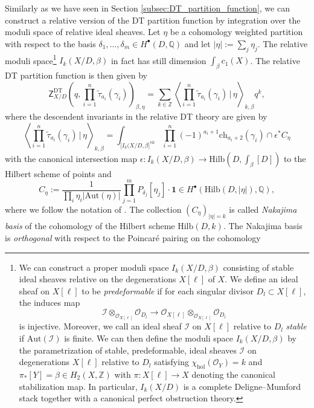 \documentclass[11pt,colorinlistoftodos]{amsart}
\numberwithin{equation}{subsection}
\theoremstyle{plain}
\theoremstyle{definition}
\theoremstyle{remark}
\newcommand{\Z}{\mathbb{Z}}
\newcommand{\Q}{\mathbb{Q}}
\begin{document}
Similarly as we have seen in Section \ref{subsec:DT_partition_function}, we can construct a relative version of the DT partition function by integration over the moduli space of relative ideal sheaves. Let $\eta$ be a cohomology weighted partition with respect to the basis $\delta_1,\ldots,\delta_m\in H^\bullet(D,\Q)$ and let $\vert\eta\vert:=\sum_j\eta_j$.
The relative moduli space\footnote{We can construct a proper moduli space $I_k(X/D,\beta)$ consisting of stable ideal sheaves relative on the degenerations $X[\ell]$ of $X$. We define an ideal sheaf on $X[\ell]$ to be \emph{predeformable} if for each singular divisor $D_l\subset X[\ell]$, the induces map 
\[
\mathscr{I}\otimes_{\mathcal{O}_{X[\ell]}}\mathcal{O}_{D_l}\to \mathcal{O}_{X[\ell]}\otimes_{\mathcal{O}_{X[\ell]}}\mathcal{O}_{D_l}
\]
is injective. Moreover, we call an ideal sheaf $\mathscr{I}$ on $X[\ell]$ relative to $D_l$ \emph{stable} if $\mathrm{Aut}(\mathscr{I})$ is finite. We can then define the moduli space $I_k(X/D,\beta)$ by the parametrization of stable, predeformable, ideal sheaves $\mathscr{I}$ on degenerations $X[\ell]$ relative to $D_l$ satisfying $\chi_\mathrm{hol}(\mathcal{O}_Y)=k$ and $\pi_*[Y]=\beta\in H_2(X,\Z)$ with $\pi\colon X[\ell]\to X$ denoting the canonical stabilization map. In particular, $I_k(X/D)$ is a complete Deligne--Mumford stack together with a canonical perfect obstruction theory.} $I_k(X/D,\beta)$ in fact has still dimension $\int_\beta c_1(X)$. The relative DT partition function is then given by 
\begin{equation}
    \label{eq:relative_DT_partition_function}
    \mathsf{Z}^\mathrm{DT}_{X/D}\left(q,\prod_{i=1}^n\tilde\tau_{a_i}(\gamma_i)\right)_{\beta,\eta}=\sum_{k\in\Z}\left\langle\prod_{i=1}^n\tilde\tau_{a_i}(\gamma_i)\,\Bigg|\, \eta\right\rangle_{k,\beta}q^k,
\end{equation}
where the descendent invariants in the relative DT theory are given by 
\[
\left\langle\prod_{i=1}^n\tilde\tau_{a_i}(\gamma_i)\,\Bigg|\,\eta\right\rangle_{k,\beta}=\int_{\big[I_k(X/D,\beta\big]^\mathrm{vir}}\prod_{i=1}^n(-1)^{a_i+1}\mathrm{ch}_{a_i+2}(\gamma_i)\cap \epsilon^*C_\eta
\]
with the canonical intersection map $\epsilon\colon I_k(X/D,\beta)\to \mathrm{Hilb}\left(D,\int_\beta[D]\right)$ to the Hilbert scheme of points and 
\[
C_\eta:=\frac{1}{\prod_i\eta_i\vert\mathrm{Aut}(\eta)\vert}\prod_{j=1}^mP_{\delta_j}[\eta_j]\cdot\boldsymbol{1}\in H^\bullet\left(\mathrm{Hilb}\left(D,\vert\eta\vert\right),\Q\right),
\]
where we follow the notation of \cite{Nakajima1999}. The collection $(C_\eta)_{\vert\eta\vert=k}$ is called \emph{Nakajima basis} of the cohomology of the Hilbert scheme $\mathrm{Hilb}(D,k)$. The Nakajima basis is \emph{orthogonal} with respect to the Poincar\'e pairing on the cohomology
\end{document}
